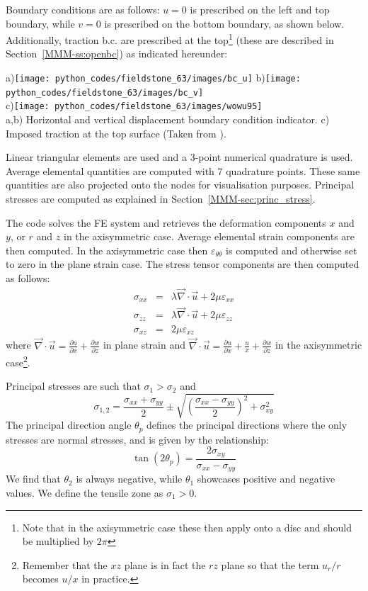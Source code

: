 Boundary conditions are as follows: $u=0$ is prescribed on the left and top boundary, 
while $v=0$ is prescribed on the bottom boundary, as shown below.
Additionally, traction b.c. are prescribed at the top\footnote{Note that 
in the axisymmetric case these then apply onto a disc and should be multiplied by $2\pi$} (these
are described in Section~\ref{MMM-ss:openbc}) as indicated hereunder:
\begin{center}
a)\texttt{[image: python\_codes/fieldstone\_63/images/bc\_u]}
b)\texttt{[image: python\_codes/fieldstone\_63/images/bc\_v]}\\
c)\texttt{[image: python\_codes/fieldstone\_63/images/wowu95]}\\
{\captionfont a,b) Horizontal and vertical displacement boundary condition indicator.
c) Imposed traction at the top surface (Taken from \cite{wowu95}).}
\end{center}

Linear triangular elements are used and a 3-point numerical quadrature is used.
Average elemental quantities are computed with 7 quadrature points.
These same quantities are also projected onto the nodes for visualisation purposes.
Principal stresses are computed as explained in Section~\ref{MMM-sec:princ_stress}.

The code solves the FE system and retrieves the deformation components $x$ and $y$,
or $r$ and $z$ in the axisymmetric case.
Average elemental strain components are then computed. In the axisymmetric case
then  $\varepsilon_{\theta\theta}$ is computed and otherwise set to zero in the plane strain case.
The stress tensor components are then computed as follows:
\begin{eqnarray}
\sigma_{xx} &=& \lambda \vec\nabla\cdot\vec{u} + 2\mu \varepsilon_{xx} \\
\sigma_{zz} &=& \lambda \vec\nabla\cdot\vec{u} + 2\mu \varepsilon_{zz} \\
\sigma_{xz} &=&  2\mu \varepsilon_{xz} 
\end{eqnarray}
where $\vec\nabla\cdot\vec{u}=\frac{\partial u}{\partial x} + \frac{\partial w}{\partial z}$
in plane strain and 
$\vec\nabla\cdot\vec{u}=\frac{\partial u}{\partial x} + \frac{u}{x} + \frac{\partial w}{\partial z}$
in the axisymmetric case\footnote{Remember that the $xz$ plane is in fact the $rz$ plane so that 
the term $u_r/r$ becomes $u/x$ in practice.}.

Principal stresses are such that $\sigma_1>\sigma_2$ and 
\[
\sigma_{1,2}=\frac{\sigma_{xx}+\sigma_{yy}}{2} 
\pm \sqrt{  \left(\frac{\sigma_{xx}-\sigma_{yy}}{2}\right)^2 +\sigma_{xy}^2 }
 \]
The principal direction angle $\theta_p$ defines the principal
directions where the only stresses are normal stresses, and 
is given by the relationship:
\[
\tan (2\theta_p) =  \frac{2 \sigma_{xy}}{\sigma_{xx} -\sigma_{yy}}
\]
We find that $\theta_2$ is always negative, while $\theta_1$ showcases positive and negative values. 
We define the tensile zone as $\sigma_1>0$.

